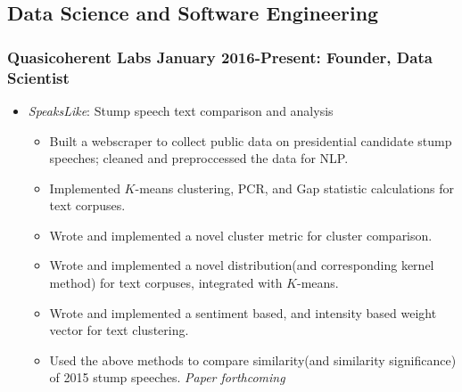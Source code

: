 \documentclass[a4paper,10pt,notitlepage]{article}
\begin{document}
\subsection*{Data Science and Software Engineering}
\subsubsection*{Quasicoherent Labs January 2016-Present: Founder, Data Scientist}
	\begin{itemize}
	\vspace{-5pt}\item 	\textit{SpeaksLike}: Stump speech text comparison and analysis \begin{itemize}
					\item 	Built a webscraper to collect public data on presidential candidate stump speeches; cleaned and preproccessed the data for NLP.
					\item 	Implemented $K$-means clustering, PCR, and Gap statistic calculations for text corpuses.
					\item 	Wrote and implemented a novel cluster metric for 	cluster comparison.
					\item 	Wrote and implemented a novel distribution(and corresponding kernel method) for text corpuses, integrated with $K$-means.
					\item 	Wrote and implemented a sentiment based, and intensity based weight vector for text clustering. 
					\item 	Used the above methods to compare similarity(and similarity significance) of 2015 stump speeches. \textit{Paper forthcoming}
					\end{itemize}
	\end{itemize}
\end{document}
